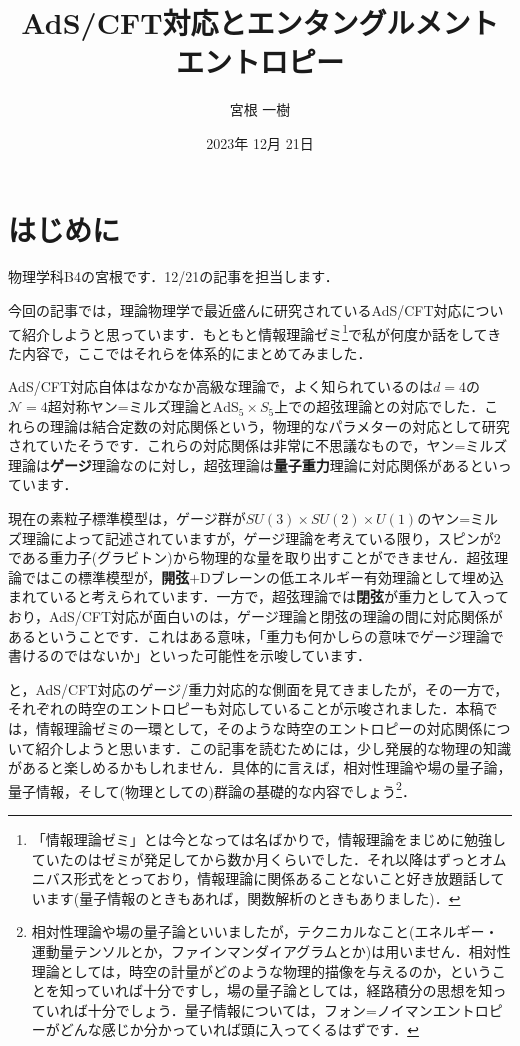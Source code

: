 \documentclass[a4paper,uplatex,dvipdfmx]{jsarticle}
\title{AdS/CFT対応とエンタングルメントエントロピー}
\author{宮根 一樹}
\date{2023年 12月 21日}
\theoremstyle{definition}
\begin{document}
\maketitle

\tableofcontents

\clearpage
\section{はじめに}

物理学科B4の宮根です．12/21の記事を担当します．

今回の記事では，理論物理学で最近盛んに研究されているAdS/CFT対応について紹介しようと思っています．もともと情報理論ゼミ\footnote{
  「情報理論ゼミ」とは今となっては名ばかりで，情報理論をまじめに勉強していたのはゼミが発足してから数か月くらいでした．それ以降はずっとオムニバス形式をとっており，情報理論に関係あることないこと好き放題話しています(量子情報のときもあれば，関数解析のときもありました)．
}で私が何度か話をしてきた内容で，ここではそれらを体系的にまとめてみました．

AdS/CFT対応自体はなかなか高級な理論で，よく知られているのは$d=4$の$\mathcal{N}=4$超対称ヤン=ミルズ理論と$\text{AdS}_{5}\times S_{5}$上での超弦理論との対応でした．これらの理論は結合定数の対応関係という，物理的なパラメターの対応として研究されていたそうです．これらの対応関係は非常に不思議なもので，ヤン=ミルズ理論は\textbf{ゲージ}理論なのに対し，超弦理論は\textbf{量子重力}理論に対応関係があるといっています．

現在の素粒子標準模型は，ゲージ群が$SU(3)\times SU(2)\times U(1)$のヤン=ミルズ理論によって記述されていますが，ゲージ理論を考えている限り，スピンが2である重力子(グラビトン)から物理的な量を取り出すことができません．超弦理論ではこの標準模型が，\textbf{開弦}$+$Dブレーンの低エネルギー有効理論として埋め込まれていると考えられています．一方で，超弦理論では\textbf{閉弦}が重力として入っており，AdS/CFT対応が面白いのは，ゲージ理論と閉弦の理論の間に対応関係があるということです．これはある意味，「重力も何かしらの意味でゲージ理論で書けるのではないか」といった可能性を示唆しています．

と，AdS/CFT対応のゲージ/重力対応的な側面を見てきましたが，その一方で，それぞれの時空のエントロピーも対応していることが示唆されました\cite{Ryu_AspectsHolographic_2006}．本稿では，情報理論ゼミの一環として，そのような時空のエントロピーの対応関係について紹介しようと思います．この記事を読むためには，少し発展的な物理の知識があると楽しめるかもしれません．具体的に言えば，相対性理論や場の量子論，量子情報，そして(物理としての)群論の基礎的な内容でしょう\footnote{
  相対性理論や場の量子論といいましたが，テクニカルなこと(エネルギー・運動量テンソルとか，ファインマンダイアグラムとか)は用いません．相対性理論としては，時空の計量がどのような物理的描像を与えるのか，ということを知っていれば十分ですし，場の量子論としては，経路積分の思想を知っていれば十分でしょう．量子情報については，フォン=ノイマンエントロピーがどんな感じか分かっていれば頭に入ってくるはずです．
}．
\end{document}
